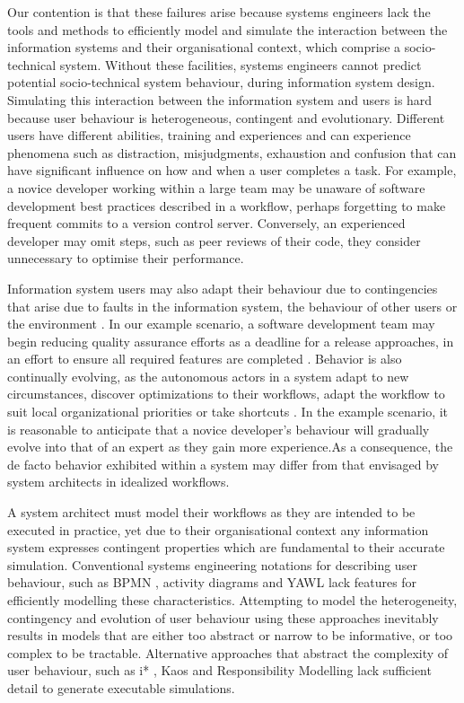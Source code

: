 \documentclass{llncs}
\begin{document}
Our contention is that these failures arise because systems engineers lack the tools and methods to efficiently model
and simulate the interaction between the information systems and their organisational context, which comprise a socio-
technical system. Without these facilities, systems engineers cannot predict potential socio-technical system
behaviour, during information system design. Simulating this interaction between the information system and users is
hard because user behaviour is heterogeneous, contingent and evolutionary.  Different users have different abilities,
training and experiences and can experience phenomena such as distraction, misjudgments, exhaustion and confusion that
can have significant influence on how and when a user completes a task.  For example, a novice developer working within
a large team may be unaware of software development best practices described in a workflow, perhaps forgetting to make
frequent commits to a version control server.  Conversely, an experienced developer may omit steps, such as peer reviews
of their code, they consider unnecessary to optimise their performance.

Information system users may also adapt their behaviour due to contingencies that arise due to faults in the information
system, the behaviour of other users or the environment \citep{sommerville09deriving}.  In our example scenario, a
software development team may begin reducing quality assurance efforts as a deadline for a release approaches, in an
effort to ensure all required features are completed \citep{beck02test}. Behavior is also continually evolving, as the
autonomous actors in a system adapt to new circumstances, discover optimizations to their workflows, adapt the workflow
to suit local organizational priorities or take shortcuts
\citep{anderson04heterogeneous,bonen79evolutionary,lyytinen2008explaining}.  In the example scenario, it is reasonable
to anticipate that a novice developer's behaviour will gradually evolve into that of an expert as they gain more
experience.As a consequence, the de facto behavior exhibited within a system may differ from that envisaged by system
architects in idealized workflows.

A system architect must model their workflows as they are intended to be executed in practice, yet due to their
organisational context any information system expresses contingent properties which are fundamental to their accurate
simulation. Conventional systems engineering notations for describing user behaviour, such as BPMN \citep{omg2011omgbpmn},
activity diagrams \citep{omg07omguml} and YAWL \citep{hofstede2010yawl} lack features for efficiently modelling these
characteristics.  Attempting to model the heterogeneity, contingency and evolution of user behaviour using these
approaches inevitably results in models that are either too abstract or narrow to be informative, or too complex to be
tractable.  Alternative approaches that abstract the complexity of user behaviour, such as i* \citep{yu1995social},
Kaos \citep{werneck2009goreistarkaos} and Responsibility Modelling \citep{sommerville09deriving} lack sufficient detail to
generate executable simulations.
\end{document}
